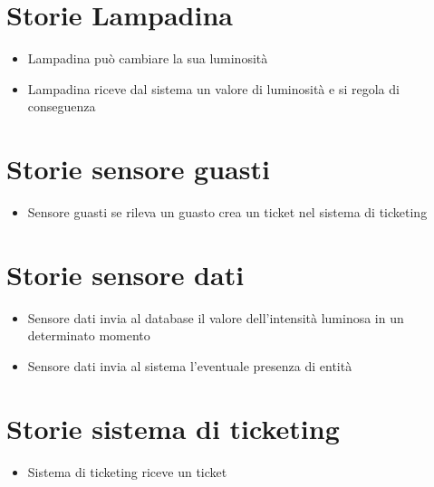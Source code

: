 \section{Storie Lampadina}
\begin{itemize}
\item Lampadina può cambiare la sua luminosità
\item Lampadina riceve dal sistema un valore di luminosità e si regola di conseguenza
\end{itemize}


\section{Storie sensore guasti}
\begin{itemize}
\item Sensore guasti se rileva un guasto crea un ticket nel sistema di ticketing
\end{itemize}


\section{Storie sensore dati}
\begin{itemize}
\item Sensore dati invia al database il valore dell'intensità luminosa in un determinato momento
\item Sensore dati invia al sistema l'eventuale presenza di entità
\end{itemize}

\section{Storie sistema di ticketing}
\begin{itemize}
\item Sistema di ticketing riceve un ticket
\end{itemize}
